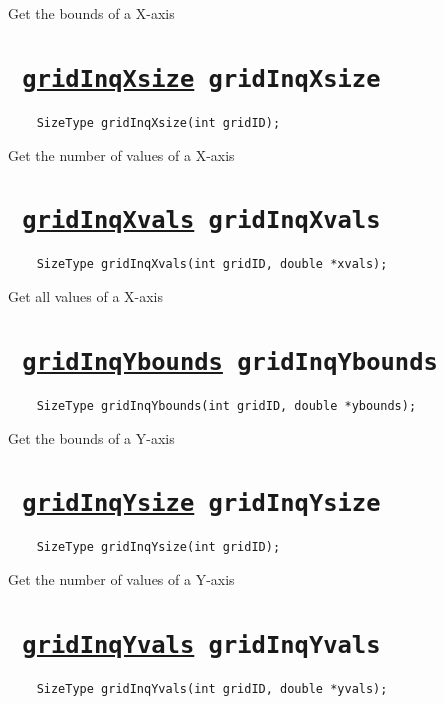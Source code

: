 Get the bounds of a X-axis
\ifpdfoutput{}{(\ref{gridInqXbounds})}


\section*{\texttt{ 
\ifpdf
\hyperref[gridInqXsize]{gridInqXsize}
\else
gridInqXsize
\fi
}}
\begin{verbatim}
    SizeType gridInqXsize(int gridID);
\end{verbatim}

Get the number of values of a X-axis
\ifpdfoutput{}{(\ref{gridInqXsize})}


\section*{\texttt{ 
\ifpdf
\hyperref[gridInqXvals]{gridInqXvals}
\else
gridInqXvals
\fi
}}
\begin{verbatim}
    SizeType gridInqXvals(int gridID, double *xvals);
\end{verbatim}

Get all values of a X-axis
\ifpdfoutput{}{(\ref{gridInqXvals})}


\section*{\texttt{ 
\ifpdf
\hyperref[gridInqYbounds]{gridInqYbounds}
\else
gridInqYbounds
\fi
}}
\begin{verbatim}
    SizeType gridInqYbounds(int gridID, double *ybounds);
\end{verbatim}

Get the bounds of a Y-axis
\ifpdfoutput{}{(\ref{gridInqYbounds})}


\section*{\texttt{ 
\ifpdf
\hyperref[gridInqYsize]{gridInqYsize}
\else
gridInqYsize
\fi
}}
\begin{verbatim}
    SizeType gridInqYsize(int gridID);
\end{verbatim}

Get the number of values of a Y-axis
\ifpdfoutput{}{(\ref{gridInqYsize})}


\section*{\texttt{ 
\ifpdf
\hyperref[gridInqYvals]{gridInqYvals}
\else
gridInqYvals
\fi
}}
\begin{verbatim}
    SizeType gridInqYvals(int gridID, double *yvals);
\end{verbatim}

